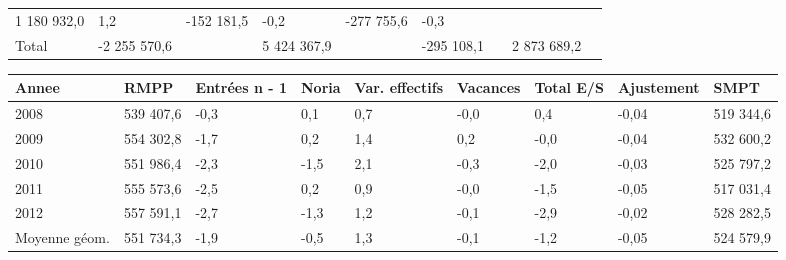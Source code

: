 \begin{longtable}[]{@{}lllllllll@{}}
\begin{minipage}[t]{0.16\columnwidth}
1 180 932,0\strut
\end{minipage} & \begin{minipage}[t]{0.06\columnwidth}\raggedright
1,2\strut
\end{minipage} & \begin{minipage}[t]{0.12\columnwidth}\raggedright
-152 181,5\strut
\end{minipage} & \begin{minipage}[t]{0.06\columnwidth}\raggedright
-0,2\strut
\end{minipage} & \begin{minipage}[t]{0.10\columnwidth}\raggedright
-277 755,6\strut
\end{minipage} & \begin{minipage}[t]{0.06\columnwidth}\raggedright
-0,3\strut
\end{minipage}\tabularnewline
\begin{minipage}[t]{0.05\columnwidth}\raggedright
Total\strut
\end{minipage} & \begin{minipage}[t]{0.10\columnwidth}\raggedright
-2 255 570,6\strut
\end{minipage} & \begin{minipage}[t]{0.06\columnwidth}\raggedright
\strut
\end{minipage} & \begin{minipage}[t]{0.16\columnwidth}\raggedright
5 424 367,9\strut
\end{minipage} & \begin{minipage}[t]{0.06\columnwidth}\raggedright
\strut
\end{minipage} & \begin{minipage}[t]{0.12\columnwidth}\raggedright
-295 108,1\strut
\end{minipage} & \begin{minipage}[t]{0.06\columnwidth}\raggedright
\strut
\end{minipage} & \begin{minipage}[t]{0.10\columnwidth}\raggedright
2 873 689,2\strut
\end{minipage} & \begin{minipage}[t]{0.06\columnwidth}\raggedright
\strut
\end{minipage}\tabularnewline
\bottomrule
\end{longtable}

\begin{longtable}[]{@{}lllllllll@{}}
\toprule
Annee & RMPP & Entrées n - 1 & Noria & Var. effectifs & Vacances & Total
E/S & Ajustement & SMPT\tabularnewline
\midrule
\endhead
2008 & 539 407,6 & -0,3 & 0,1 & 0,7 & -0,0 & 0,4 & -0,04 & 519
344,6\tabularnewline
2009 & 554 302,8 & -1,7 & 0,2 & 1,4 & 0,2 & -0,0 & -0,04 & 532
600,2\tabularnewline
2010 & 551 986,4 & -2,3 & -1,5 & 2,1 & -0,3 & -2,0 & -0,03 & 525
797,2\tabularnewline
2011 & 555 573,6 & -2,5 & 0,2 & 0,9 & -0,0 & -1,5 & -0,05 & 517
031,4\tabularnewline
2012 & 557 591,1 & -2,7 & -1,3 & 1,2 & -0,1 & -2,9 & -0,02 & 528
282,5\tabularnewline
Moyenne géom. & 551 734,3 & -1,9 & -0,5 & 1,3 & -0,1 & -1,2 & -0,05 &
524 579,9\tabularnewline
\bottomrule
\end{longtable}

